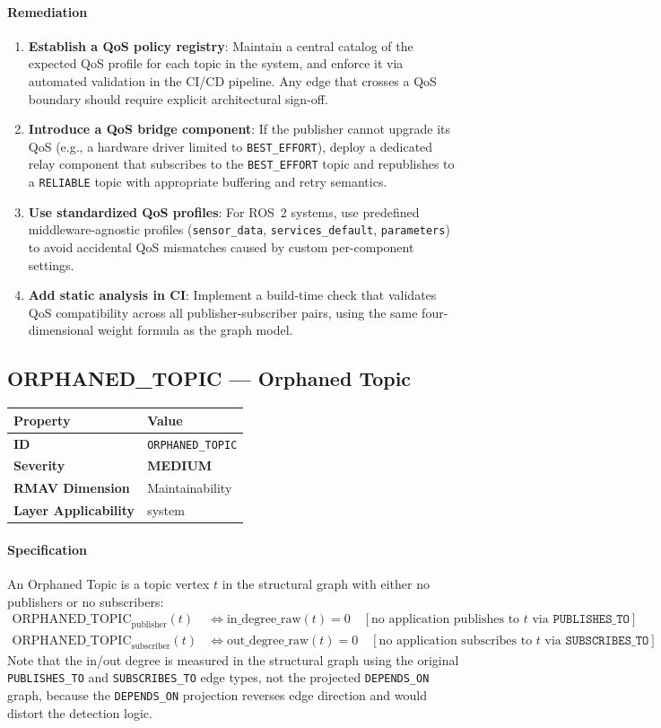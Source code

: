 \documentclass[11pt]{article}
\makeatletter
\newcommand{\MEDIUM}{\textcolor{yellow!50!black}{\textbf{MEDIUM}}}
\newcommand{\patternprop}[4]{%
  \begin{center}
  \begin{tabular}{@{}ll@{}}
  \toprule
  \textbf{Property} & \textbf{Value} \\
  \midrule
  \textbf{ID} & \texttt{#1} \\
  \textbf{Severity} & #2 \\
  \textbf{RMAV Dimension} & #3 \\
  \textbf{Layer Applicability} & #4 \\
  \bottomrule
  \end{tabular}
  \end{center}
}
\makeatother
\begin{document}
\paragraph{Remediation}
\begin{enumerate}[leftmargin=*]
\item \textbf{Establish a QoS policy registry}: Maintain a central catalog of the expected QoS profile for each topic in the system, and enforce it via automated validation in the CI/CD pipeline. Any edge that crosses a QoS boundary should require explicit architectural sign-off.
\item \textbf{Introduce a QoS bridge component}: If the publisher cannot upgrade its QoS (e.g., a hardware driver limited to \texttt{BEST\_EFFORT}), deploy a dedicated relay component that subscribes to the \texttt{BEST\_EFFORT} topic and republishes to a \texttt{RELIABLE} topic with appropriate buffering and retry semantics.
\item \textbf{Use standardized QoS profiles}: For ROS~2 systems, use predefined middleware-agnostic profiles (\texttt{sensor\_data}, \texttt{services\_default}, \texttt{parameters}) to avoid accidental QoS mismatches caused by custom per-component settings.
\item \textbf{Add static analysis in CI}: Implement a build-time check that validates QoS compatibility across all publisher-subscriber pairs, using the same four-dimensional weight formula as the graph model.
\end{enumerate}

\subsection{ORPHANED\_TOPIC --- Orphaned Topic}
\patternprop{ORPHANED\_TOPIC}{\MEDIUM}{Maintainability}{system}

\paragraph{Specification}
An Orphaned Topic is a topic vertex $t$ in the structural graph with either no publishers or no subscribers:
\begin{align*}
\mathrm{ORPHANED\_TOPIC}_{\text{publisher}}(t) &\Leftrightarrow \mathrm{in\_degree\_raw}(t) = 0 \quad [\text{no application publishes to } t \text{ via } \texttt{PUBLISHES\_TO}] \\
\mathrm{ORPHANED\_TOPIC}_{\text{subscriber}}(t) &\Leftrightarrow \mathrm{out\_degree\_raw}(t) = 0 \quad [\text{no application subscribes to } t \text{ via } \texttt{SUBSCRIBES\_TO}]
\end{align*}
Note that the in/out degree is measured in the structural graph using the original \texttt{PUBLISHES\_TO} and \texttt{SUBSCRIBES\_TO} edge types, not the projected \texttt{DEPENDS\_ON} graph, because the \texttt{DEPENDS\_ON} projection reverses edge direction and would distort the detection logic.
\end{document}
